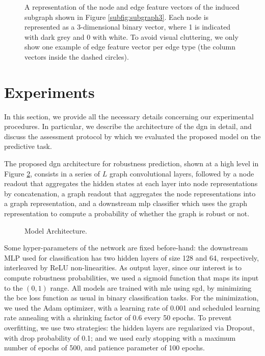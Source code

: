 \begin{figure}[h!]
    \centering
    \resizebox{.8\textwidth}{!}{}
    \caption{A representation of the node and edge feature vectors of the induced subgraph shown in Figure \ref{subfig:subgraph3}. Each node is represented as a 3-dimensional binary vector, where 1 is indicated with dark grey and 0 with white. To avoid visual cluttering, we only show one example of edge feature vector per edge type (the column vectors inside the dashed circles).}
    \label{fig:pathway-graph-features}
\end{figure}

\section{Experiments}\label{sec:pathway-experiments}
In this section, we provide all the necessary details concerning our experimental procedures. In particular, we describe the architecture of the \gls{dgn} in detail, and discuss the assessment protocol by which we evaluated the proposed model on the predictive task.

The proposed \gls{dgn} architecture for robustness prediction, shown at a high level in Figure \ref{fig:architecture}, consists in a series of $L$ graph convolutional layers, followed by a node readout that aggregates the hidden states at each layer into node representations by concatenation, a graph readout that aggregates the node representations into a graph representation, and a downstream \gls{mlp} classifier which uses the graph representation to compute a probability of whether the graph is robust or not.
\begin{figure}[h!]
    \centering
    \resizebox{.95\textwidth}{!}{}
    \caption{Model Architecture.}
    \label{fig:architecture}
\end{figure}
Some hyper-parameters of the network are fixed before-hand: the downstream MLP used for classification has two hidden layers of size 128 and 64, respectively, interleaved by ReLU non-linearities. As output layer, since our interest is to compute robustness probabilities, we used a sigmoid function that maps its input to the $(0, 1)$ range. All models are trained with \gls{mle} using \gls{sgd}, by minimizing the \gls{bce} loss function as usual in binary classification tasks. For the minimization, we used the Adam optimizer, with a learning rate of 0.001 and scheduled learning rate annealing with a shrinking factor of 0.6 every 50 epochs. To prevent overfitting, we use two strategies: the hidden layers are regularized via Dropout, with drop probability of 0.1; and we used early stopping with a maximum number of epochs of 500, and patience parameter of 100 epochs.

